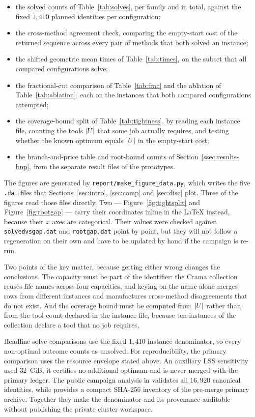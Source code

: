 \begin{itemize}[topsep=3pt,itemsep=1pt]
  \item the solved counts of Table~\ref{tab:solves}, per family and in total, against
  the fixed $1{,}410$ planned identities per configuration;
  \item the cross-method agreement check, comparing the empty-start cost of the
  returned sequence across every pair of methods that both solved an instance;
  \item the shifted geometric mean times of Table~\ref{tab:times}, on the subset that
  all compared configurations solve;
  \item the fractional-cut comparison of Table~\ref{tab:frac} and the ablation of
  Table~\ref{tab:ablation}, each on the instances that both compared configurations
  attempted;
  \item the coverage-bound split of Table~\ref{tab:tightness}, by reading each instance
  file, counting the tools $\lvert U\rvert$ that some job actually requires, and testing
  whether the known optimum equals $\lvert U\rvert$ in the empty-start cost;
  \item the branch-and-price table and root-bound counts of
  Section~\ref{ssec:results-bnp}, from the separate result files of the prototypes.
\end{itemize}

The figures are generated by \texttt{report/make\_figure\_data.py}, which writes the
five \texttt{.dat} files that Sections~\ref{sec:intro}, \ref{sec:comp} and
\ref{sec:disc} plot. Three of the figures read those files directly. Two ---
Figure~\ref{fig:tightsplit} and Figure~\ref{fig:rootgap} --- carry their coordinates
inline in the \LaTeX{} instead, because their $x$ axes are categorical. Their values
were checked against \texttt{solvedvsgap.dat} and \texttt{rootgap.dat} point by point,
but they will not follow a regeneration on their own and have to be updated by hand if
the campaign is re-run.

Two points of the key matter, because getting either wrong changes the
conclusions. The capacity must be part of the identifier: the Crama collection reuses
file names across four capacities, and keying on the name alone merges rows from
different instances and manufactures cross-method disagreements that do not exist. And
the coverage bound must be computed from $\lvert U\rvert$ rather than from the tool
count declared in the instance file, because ten instances of the collection declare a
tool that no job requires.

Headline solve comparisons use the fixed $1{,}410$-instance denominator, so every
non-optimal outcome counts as unsolved. For reproducibility, the primary comparison uses
the resource envelope stated above. An auxiliary LSS sensitivity
used 32~GiB; it certifies no additional optimum and is never merged with the primary
ledger. The public campaign analysis in
 validates all $16{,}920$ canonical
identities, while
 provides a compact SHA-256
inventory of the pre-merge primary archive. Together they make the denominator and its
provenance auditable without publishing the private cluster workspace.
